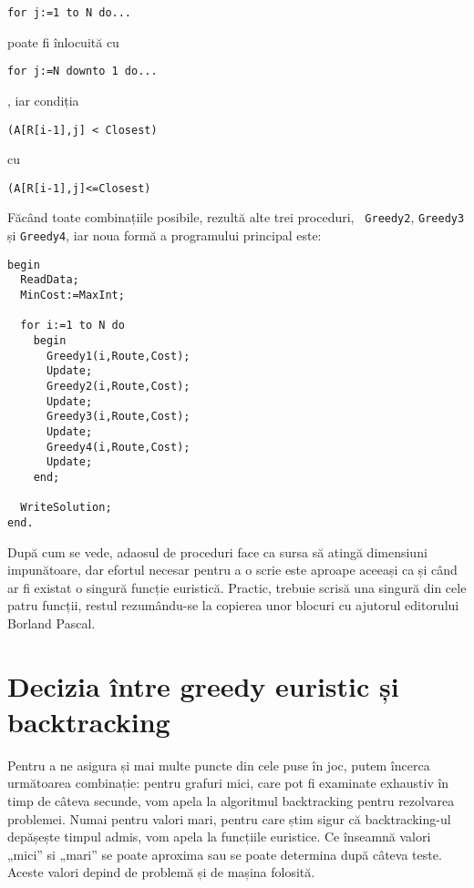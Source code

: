 \begin{verbatim}
for j:=1 to N do...
\end{verbatim}

poate fi înlocuită cu

\begin{verbatim}
for j:=N downto 1 do...
\end{verbatim}

, iar condiția

\begin{verbatim}
(A[R[i-1],j] < Closest)
\end{verbatim}

cu

\begin{verbatim}
(A[R[i-1],j]<=Closest)
\end{verbatim}

Făcând toate combinațiile posibile, rezultă alte trei proceduri, {\tt
  Greedy2}, {\tt Greedy3} și {\tt Greedy4}, iar noua formă a programului
principal este:

\begin{verbatim}
begin
  ReadData;
  MinCost:=MaxInt;

  for i:=1 to N do
    begin
      Greedy1(i,Route,Cost);
      Update;
      Greedy2(i,Route,Cost);
      Update;
      Greedy3(i,Route,Cost);
      Update;
      Greedy4(i,Route,Cost);
      Update;
    end;

  WriteSolution;
end.
\end{verbatim}

După cum se vede, adaosul de proceduri face ca sursa să atingă dimensiuni
impunătoare, dar efortul necesar pentru a o scrie este aproape aceeași ca și
când ar fi existat o singură funcție euristică. Practic, trebuie scrisă una
singură din cele patru funcții, restul rezumându-se la copierea unor blocuri
cu ajutorul editorului Borland Pascal.

\section{Decizia între greedy euristic și backtracking}

Pentru a ne asigura și mai multe puncte din cele puse în joc, putem încerca
următoarea combinație: pentru grafuri mici, care pot fi examinate exhaustiv în
timp de câteva secunde, vom apela la algoritmul backtracking pentru rezolvarea
problemei. Numai pentru valori mari, pentru care știm sigur că backtracking-ul
depășește timpul admis, vom apela la funcțiile euristice. Ce înseamnă valori
„mici” si „mari” se poate aproxima sau se poate determina după câteva
teste. Aceste valori depind de problemă și de mașina folosită.

